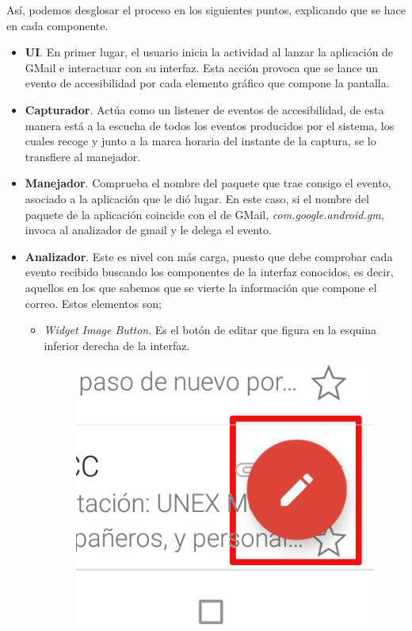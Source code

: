 \documentclass[12pt,a4paper,oneside]{book} %
\begin{document}
 Así, podemos desglosar el proceso en los siguientes puntos, explicando que se hace en cada componente. 
\begin{itemize}
\item \textbf{UI}. En primer lugar, el usuario inicia la actividad al lanzar la aplicación de GMail e interactuar con su interfaz. Esta acción provoca que se lance un evento de accesibilidad por cada elemento gráfico que compone la pantalla. 
\item \textbf{Capturador}. Actúa como un listener de eventos de accesibilidad, de esta manera está a la escucha de todos los eventos producidos por el sistema, los cuales recoge y junto a la marca horaria del instante de la captura, se lo transfiere al manejador. 
\item \textbf{Manejador}. Comprueba el nombre del paquete que trae consigo el evento, asociado a la aplicación que le dió lugar. En este caso, si el nombre del paquete de la aplicación coincide con el de GMail, \textit{com.google.android.gm}, invoca al analizador de gmail y le delega el evento. 
\item \textbf{Analizador}. Este es nivel con más carga, puesto que debe comprobar cada evento recibido buscando los componentes de la interfaz conocidos, es decir, aquellos en los que sabemos que se vierte la información que compone el correo. Estos elementos son; 
\begin{itemize}
\item \textit{Widget Image Button}. Es el botón de editar que figura en la esquina inferior derecha de la interfaz. 
 	\begin{figure}[htb]
		\begin{center}
     		\includegraphics[scale=0.2]{pictures/IRL/GMail/dashboard_gmail_nuevo_correo_cutted.png}

\end{center}
\end{figure}
\end{itemize}
\end{itemize}
\end{document}
